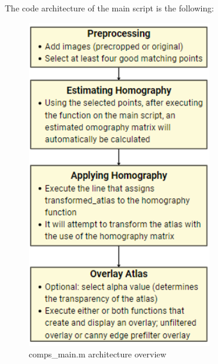 \documentclass[10pt,twocolumn]{article}
\begin{document}
The code architecture of the main script is the following:
\begin{figure}[htp]
    \centering
    \includegraphics[width=8cm]{overview.png}
    \caption{comps\_main.m architecture overview}
\end{figure}

\printbibliography
\end{document}
